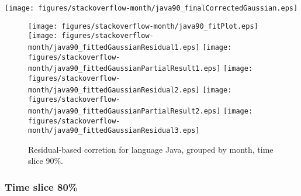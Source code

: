 \begin{center}
{\texttt{[image: figures/stackoverflow-month/java90\_finalCorrectedGaussian.eps]}}
\end{center}

\FloatBarrier

\begin{figure}[t]
\centering
{}
{\texttt{[image: figures/stackoverflow-month/java90\_fitPlot.eps]}}
{\texttt{[image: figures/stackoverflow-month/java90\_fittedGaussianResidual1.eps]}}
{\texttt{[image: figures/stackoverflow-month/java90\_fittedGaussianPartialResult1.eps]}}
{\texttt{[image: figures/stackoverflow-month/java90\_fittedGaussianResidual2.eps]}}
{\texttt{[image: figures/stackoverflow-month/java90\_fittedGaussianPartialResult2.eps]}}
{\texttt{[image: figures/stackoverflow-month/java90\_fittedGaussianResidual3.eps]}}
\caption{Residual-based corretion for language Java, grouped by month, time slice 90\%.}
\end{figure}


\FloatBarrier


\subsubsection{Time slice 80\%}

